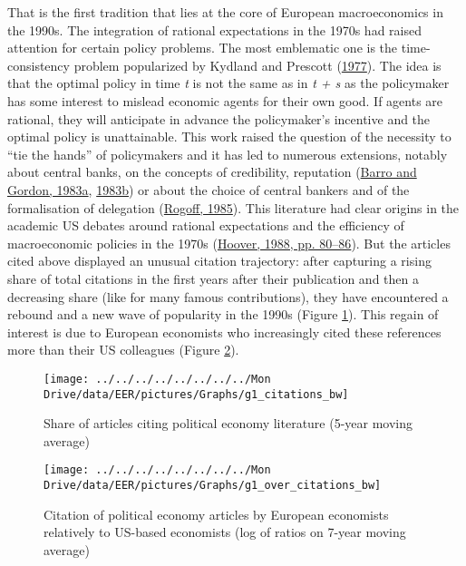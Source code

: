 \documentclass[
  12pt,
  onecolumn]{article}
\begin{document}
That is the first tradition that lies at the core of European
macroeconomics in the 1990s. The integration of rational expectations in
the 1970s had raised attention for certain policy problems. The most
emblematic one is the time-consistency problem popularized by Kydland
and Prescott (\protect\hyperlink{ref-kydland1977}{1977}). The idea is
that the optimal policy in time \emph{t} is not the same as in \emph{t +
s} as the policymaker has some interest to mislead economic agents for
their own good. If agents are rational, they will anticipate in advance
the policymaker's incentive and the optimal policy is unattainable. This
work raised the question of the necessity to ``tie the hands'' of
policymakers and it has led to numerous extensions, notably about
central banks, on the concepts of credibility, reputation
(\protect\hyperlink{ref-barro1983}{Barro and Gordon, 1983a},
\protect\hyperlink{ref-barro1983c}{1983b}) or about the choice of
central bankers and of the formalisation of delegation
(\protect\hyperlink{ref-rogoff1985b}{Rogoff, 1985}). This literature had
clear origins in the academic US debates around rational expectations
and the efficiency of macroeconomic policies in the 1970s
(\protect\hyperlink{ref-hoover1988}{Hoover, 1988, pp. 80--86}). But the
articles cited above displayed an unusual citation trajectory: after
capturing a rising share of total citations in the first years after
their publication and then a decreasing share (like for many famous
contributions), they have encountered a rebound and a new wave of
popularity in the 1990s (Figure \ref{fig:plot-political-economy}). This
regain of interest is due to European economists who increasingly cited
these references more than their US colleagues (Figure
\ref{fig:plot-political-economy-europe}).

\begin{figure}[h]

{\centering \texttt{[image: ../../../../../../../../Mon Drive/data/EER/pictures/Graphs/g1\_citations\_bw]} 

}

\caption{Share of articles citing political economy literature (5-year moving average)}\label{fig:plot-political-economy}
\end{figure}

\begin{figure}[h]

{\centering \texttt{[image: ../../../../../../../../Mon Drive/data/EER/pictures/Graphs/g1\_over\_citations\_bw]} 

}

\caption{Citation of political economy articles by European economists relatively to US-based economists (log of ratios on 7-year moving average)}\label{fig:plot-political-economy-europe}
\end{figure}
\end{document}
